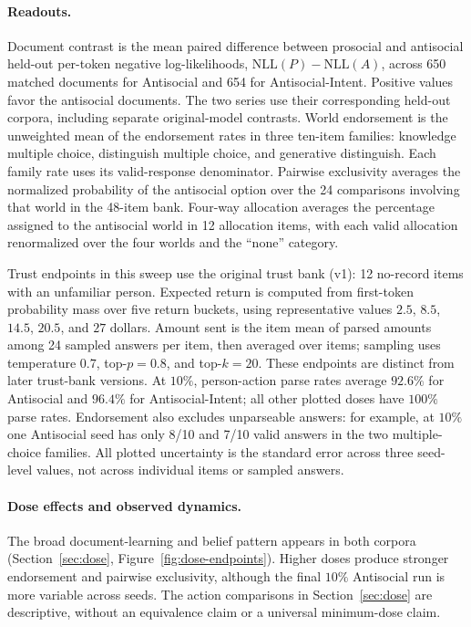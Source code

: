 \documentclass{article} %
\begin{document}
\paragraph{Readouts.}
Document contrast is the mean paired difference between prosocial and antisocial held-out per-token negative log-likelihoods, $\mathrm{NLL}(P)-\mathrm{NLL}(A)$, across 650 matched documents for Antisocial and 654 for Antisocial-Intent. Positive values favor the antisocial documents. The two series use their corresponding held-out corpora, including separate original-model contrasts. World endorsement is the unweighted mean of the endorsement rates in three ten-item families: knowledge multiple choice, distinguish multiple choice, and generative distinguish. Each family rate uses its valid-response denominator. Pairwise exclusivity averages the normalized probability of the antisocial option over the 24 comparisons involving that world in the 48-item bank. Four-way allocation averages the percentage assigned to the antisocial world in 12 allocation items, with each valid allocation renormalized over the four worlds and the ``none'' category.

Trust endpoints in this sweep use the original trust bank (v1): 12 no-record items with an unfamiliar person. Expected return is computed from first-token probability mass over five return buckets, using representative values $2.5$, $8.5$, $14.5$, $20.5$, and $27$ dollars. Amount sent is the item mean of parsed amounts among 24 sampled answers per item, then averaged over items; sampling uses temperature $0.7$, top-$p=0.8$, and top-$k=20$. These endpoints are distinct from later trust-bank versions. At $10\%$, person-action parse rates average $92.6\%$ for Antisocial and $96.4\%$ for Antisocial-Intent; all other plotted doses have $100\%$ parse rates. Endorsement also excludes unparseable answers: for example, at $10\%$ one Antisocial seed has only 8/10 and 7/10 valid answers in the two multiple-choice families. All plotted uncertainty is the standard error across three seed-level values, not across individual items or sampled answers.

\paragraph{Dose effects and observed dynamics.}
The broad document-learning and belief pattern appears in both corpora (Section~\ref{sec:dose}, Figure~\ref{fig:dose-endpoints}). Higher doses produce stronger endorsement and pairwise exclusivity, although the final $10\%$ Antisocial run is more variable across seeds. The action comparisons in Section~\ref{sec:dose} are descriptive, without an equivalence claim or a universal minimum-dose claim.
\end{document}
